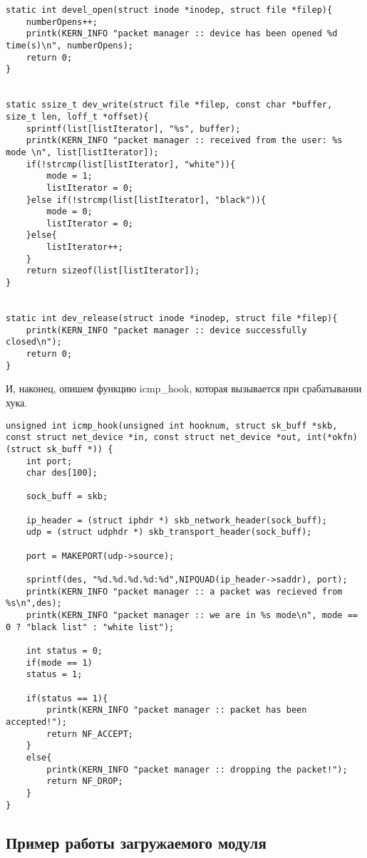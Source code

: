 \begin{lstlisting}[caption = Функции структуры file\_operations]
static int devel_open(struct inode *inodep, struct file *filep){
	numberOpens++;
	printk(KERN_INFO "packet manager :: device has been opened %d time(s)\n", numberOpens);
	return 0;
}


static ssize_t dev_write(struct file *filep, const char *buffer, size_t len, loff_t *offset){
	sprintf(list[listIterator], "%s", buffer);   
	printk(KERN_INFO "packet manager :: received from the user: %s mode \n", list[listIterator]);
	if(!strcmp(list[listIterator], "white")){
		mode = 1;
		listIterator = 0;
	}else if(!strcmp(list[listIterator], "black")){
		mode = 0;
		listIterator = 0;	
	}else{
		listIterator++;
	}	
	return sizeof(list[listIterator]);
}


static int dev_release(struct inode *inodep, struct file *filep){
	printk(KERN_INFO "packet manager :: device successfully closed\n");
	return 0;
}\end{lstlisting}

И, наконец, опишем функцию icmp\_hook, которая вызывается при срабатывании хука.
\begin{lstlisting}[caption=func icmp\_hook]
unsigned int icmp_hook(unsigned int hooknum, struct sk_buff *skb, 
const struct net_device *in, const struct net_device *out, int(*okfn)(struct sk_buff *)) {
	int port;
	char des[100];
	
	sock_buff = skb;
	
	ip_header = (struct iphdr *) skb_network_header(sock_buff);
	udp = (struct udphdr *) skb_transport_header(sock_buff);
	
	port = MAKEPORT(udp->source);
	
	sprintf(des, "%d.%d.%d.%d:%d",NIPQUAD(ip_header->saddr), port);
	printk(KERN_INFO "packet manager :: a packet was recieved from %s\n",des);
	printk(KERN_INFO "packet manager :: we are in %s mode\n", mode == 0 ? "black list" : "white list");

	int status = 0;
	if(mode == 1)
	status = 1;

	if(status == 1){
		printk(KERN_INFO "packet manager :: packet has been accepted!");
		return NF_ACCEPT;
	}
	else{
		printk(KERN_INFO "packet manager :: dropping the packet!");
		return NF_DROP;	
	}
}
\end{lstlisting}
\newpage
\subsection*{Пример работы загружаемого модуля}


